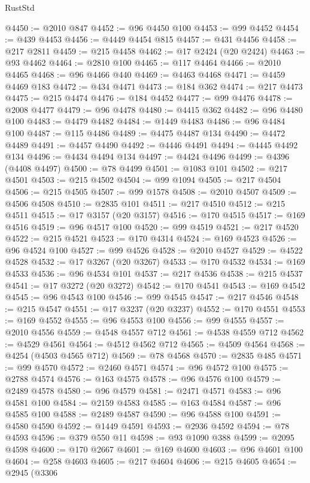 \begin{lexlean}{RustStd}
\begin{coremodule}
@4450 := @2010 @847
@4452 := @96 @4450 @100
@4453 := @99 @4452
@4454 := @439 @4453
@4456 := @4449 @4454 @815
@4457 := @431 @4456
@4458 := @217 @2811
@4459 := @215 @4458
@4462 := @17 @2424 (@20 @2424)
@4463 := @93 @4462
@4464 := @2810 @100
@4465 := @117 @4464
@4466 := @2010 @4465
@4468 := @96 @4466 @440
@4469 := @4463 @4468
@4471 := @4459 @4469 @183
@4472 := @434 @4471
@4473 := @184 @362
@4474 := @217 @4473
@4475 := @215 @4474
@4476 := @184 @4452
@4477 := @99 @4476
@4478 := @2008 @4477
@4479 := @96 @4478
@4480 := @4415 @362
@4482 := @96 @4480 @100
@4483 := @4479 @4482
@4484 := @1449 @4483
@4486 := @96 @4484 @100
@4487 := @115 @4486
@4489 := @4475 @4487 @134
@4490 := @4472 @4489
@4491 := @4457 @4490
@4492 := @4446 @4491
@4494 := @4445 @4492 @134
@4496 := @4434 @4494 @134
@4497 := @4424 @4496
@4499 := @4396 (@4408 @4497)
@4500 := @78 @4499
@4501 := @1083 @101
@4502 := @217 @4501
@4503 := @215 @4502
@4504 := @99 @1094
@4505 := @217 @4504
@4506 := @215 @4505
@4507 := @99 @1578
@4508 := @2010 @4507
@4509 := @4506 @4508
@4510 := @2835 @101
@4511 := @217 @4510
@4512 := @215 @4511
@4515 := @17 @3157 (@20 @3157)
@4516 := @170 @4515
@4517 := @169 @4516
@4519 := @96 @4517 @100
@4520 := @99 @4519
@4521 := @217 @4520
@4522 := @215 @4521
@4523 := @170 @4314
@4524 := @169 @4523
@4526 := @96 @4524 @100
@4527 := @99 @4526
@4528 := @2010 @4527
@4529 := @4522 @4528
@4532 := @17 @3267 (@20 @3267)
@4533 := @170 @4532
@4534 := @169 @4533
@4536 := @96 @4534 @101
@4537 := @217 @4536
@4538 := @215 @4537
@4541 := @17 @3272 (@20 @3272)
@4542 := @170 @4541
@4543 := @169 @4542
@4545 := @96 @4543 @100
@4546 := @99 @4545
@4547 := @217 @4546
@4548 := @215 @4547
@4551 := @17 @3237 (@20 @3237)
@4552 := @170 @4551
@4553 := @169 @4552
@4555 := @96 @4553 @100
@4556 := @99 @4555
@4557 := @2010 @4556
@4559 := @4548 @4557 @712
@4561 := @4538 @4559 @712
@4562 := @4529 @4561
@4564 := @4512 @4562 @712
@4565 := @4509 @4564
@4568 := @4254 (@4503 @4565 @712)
@4569 := @78 @4568
@4570 := @2835 @485
@4571 := @99 @4570
@4572 := @2460 @4571
@4574 := @96 @4572 @100
@4575 := @2788 @4574
@4576 := @163 @4575
@4578 := @96 @4576 @100
@4579 := @2489 @4578
@4580 := @96 @4579
@4581 := @2471 @4571
@4583 := @96 @4581 @100
@4584 := @2159 @4583
@4585 := @163 @4584
@4587 := @96 @4585 @100
@4588 := @2489 @4587
@4590 := @96 @4588 @100
@4591 := @4580 @4590
@4592 := @1449 @4591
@4593 := @2936 @4592
@4594 := @78 @4593
@4596 := @379 @550 @11
@4598 := @93 @1090 @388
@4599 := @2095 @4598
@4600 := @170 @2667
@4601 := @169 @4600
@4603 := @96 @4601 @100
@4604 := @258 @4603
@4605 := @217 @4604
@4606 := @215 @4605
@4654 := @2945
    (@3306

\end{coremodule}
\end{lexlean}
